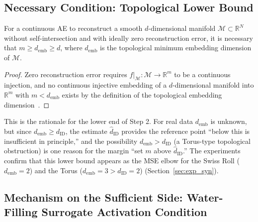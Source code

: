 \documentclass[make,article,submit,pdftex,moreauthors]{Definitions/mdpi}
\newcommand{\dID}{d_{\mathrm{ID}}}
\newcommand{\hatdID}{\hat{d}_{\mathrm{ID}}}
\newcommand{\R}{\mathbb{R}}
\newcommand{\demb}{d_{\mathrm{emb}}}
\begin{document}
\subsection{Necessary Condition: Topological Lower Bound}\label{sec:theory_lower}

\begin{Proposition}\label{thm:lower_bound}
For a continuous AE to reconstruct a smooth $d$-dimensional manifold
$\mathcal{M} \subset \R^N$ without self-intersection and with ideally zero
reconstruction error, it is necessary that $m \geq \demb \geq d$, where
$\demb$ is the topological minimum embedding dimension of $\mathcal{M}$.
\end{Proposition}

\begin{proof}
Zero reconstruction error requires $f|_\mathcal{M}: \mathcal{M} \to \R^m$
to be a continuous injection, and no continuous injective embedding of a
$d$-dimensional manifold into $\R^m$ with $m < \demb$ exists by the
definition of the topological embedding
dimension~\cite{hatcher2002algebraic}.
\end{proof}

This is the rationale for the lower end of Step 2.
For real data $\demb$ is unknown, but since $\demb \geq \dID$, the estimate
$\hatdID$ provides the reference point ``below this is insufficient in
principle,'' and the possibility $\demb > \dID$ (a Torus-type topological
obstruction) is one reason for the margin ``set $m$ above $\hatdID$.''
The experiments confirm that this lower bound appears as the MSE elbow for
the Swiss Roll ($\demb = 2$) and the Torus ($\demb = 3 > \dID = 2$)
(Section~\ref{sec:exp_syn}).

\subsection{Mechanism on the Sufficient Side: Water-Filling Surrogate Activation Condition}\label{sec:theory_wf}
\end{document}
